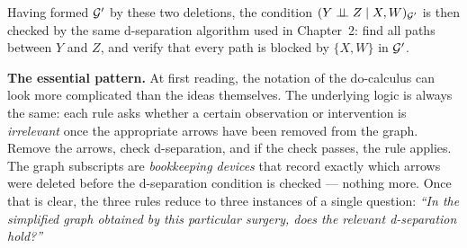 \documentclass[master.tex]{subfiles}
\begin{document}
\medskip\noindent
Having formed $\mathcal{G}'$ by these two deletions, the condition
$(Y \perp\!\!\!\perp Z \mid X, W)_{\mathcal{G}'}$ is then checked by the same
d-separation algorithm used in Chapter~2: find all paths between $Y$ and
$Z$, and verify that every path is blocked by $\{X, W\}$ in $\mathcal{G}'$.

\medskip\noindent
\textbf{The essential pattern.}
At first reading, the notation of the do-calculus can look more
complicated than the ideas themselves.  The underlying logic is always
the same: each rule asks whether a certain observation or intervention
is \emph{irrelevant} once the appropriate arrows have been removed from
the graph.  Remove the arrows, check d-separation, and if the check
passes, the rule applies.  The graph subscripts are
\emph{bookkeeping devices} that record exactly which arrows were deleted
before the d-separation condition is checked --- nothing more.
Once that is clear, the three rules reduce to three instances of a
single question: \emph{``In the simplified graph obtained by this
particular surgery, does the relevant d-separation hold?''}
\end{document}
